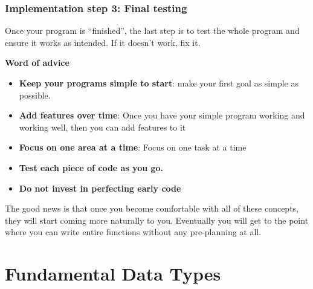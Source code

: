 \documentclass[
  letterpaper,
  DIV=11,
  numbers=noendperiod]{scrreprt}
\providecommand{\tightlist}{%
  \setlength{\itemsep}{0pt}\setlength{\parskip}{0pt}}\usepackage{longtable,booktabs,array}
\begin{document}
\hypertarget{implementation-step-3-final-testing}{%
\subsection{Implementation step 3: Final
testing}\label{implementation-step-3-final-testing}}

Once your program is ``finished'', the last step is to test the whole
program and ensure it works as intended. If it doesn't work, fix it.

\begin{tcolorbox}[enhanced jigsaw, toprule=.15mm, rightrule=.15mm, opacityback=0, breakable, leftrule=.75mm, colback=white, colframe=quarto-callout-tip-color-frame, arc=.35mm, left=2mm, bottomrule=.15mm]
\begin{minipage}[t]{5.5mm}
\textcolor{quarto-callout-tip-color}{\faLightbulb}
\end{minipage}%
\begin{minipage}[t]{\textwidth - 5.5mm}

\textbf{Word of advice}\vspace{2mm}

\begin{itemize}
\tightlist
\item
  \textbf{Keep your programs simple to start}: make your first goal as
  simple as possible.
\item
  \textbf{Add features over time}: Once you have your simple program
  working and working well, then you can add features to it
\item
  \textbf{Focus on one area at a time}: Focus on one task at a time
\item
  \textbf{Test each piece of code as you go.}
\item
  \textbf{Do not invest in perfecting early code}
\end{itemize}

\end{minipage}%
\end{tcolorbox}

The good news is that once you become comfortable with all of these
concepts, they will start coming more naturally to you. Eventually you
will get to the point where you can write entire functions without any
pre-planning at all.


\hypertarget{fundamental-data-types}{%
\chapter{Fundamental Data Types}\label{fundamental-data-types}}
\end{document}
